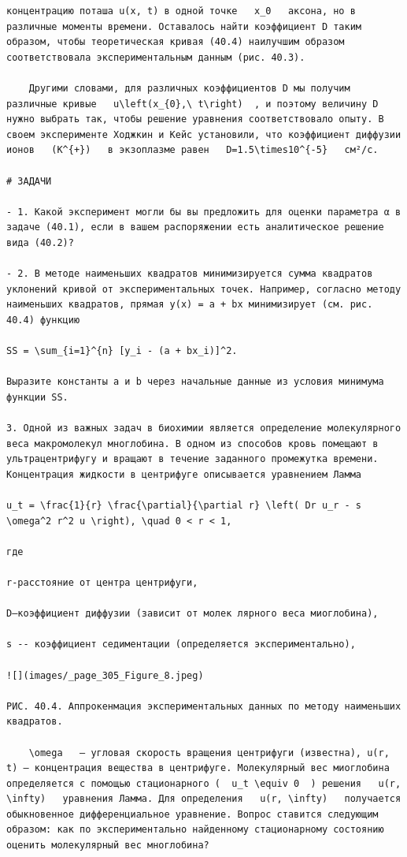 \documentclass[
  ukrainian,
]{article}
\begin{document}
\begin{verbatim}
концентрацию поташа u(x, t) в одной точке   x_0   аксона, но в различные моменты времени. Оставалось найти коэффициент D таким образом, чтобы теоретическая кривая (40.4) наилучшим образом соответствовала экспериментальным данным (рис. 40.3).

    Другими словами, для различных коэффициентов D мы получим различные кривые   u\left(x_{0},\ t\right)  , и поэтому величину D нужно выбрать так, чтобы решение уравнения соответствовало опыту. В своем эксперименте Ходжкин и Кейс установили, что коэффициент диффузии ионов   (K^{+})   в экзоплазме равен   D=1.5\times10^{-5}   см²/с.

# ЗАДАЧИ

- 1. Какой эксперимент могли бы вы предложить для оценки параметра α в задаче (40.1), если в вашем распоряжении есть аналитическое решение вида (40.2)?

- 2. В методе наименьших квадратов минимизируется сумма квадратов уклонений кривой от экспериментальных точек. Например, согласно методу наименьших квадратов, прямая y(x) = a + bx минимизирует (см. рис. 40.4) функцию

SS = \sum_{i=1}^{n} [y_i - (a + bx_i)]^2.

Выразите константы a и b через начальные данные из условия минимума функции SS.

3. Одной из важных задач в биохимии является определение молекулярного веса макромолекул многлобина. В одном из способов кровь помещают в ультрацентрифугу и вращают в течение заданного промежутка времени. Концентрация жидкости в центрифуге описывается уравнением Ламма

u_t = \frac{1}{r} \frac{\partial}{\partial r} \left( Dr u_r - s \omega^2 r^2 u \right), \quad 0 < r < 1,

где

r-расстояние от центра центрифуги,

D—коэффициент диффузии (зависит от молек лярного веса миоглобина),

s -- коэффициент седиментации (определяется экспериментально),

![](images/_page_305_Figure_8.jpeg)

РИС. 40.4. Аппрокенмация экспериментальных данных по методу наименьших квадратов.

    \omega   — угловая скорость вращения центрифуги (известна), u(r, t) — концентрация вещества в центрифуге. Молекулярный вес миоглобина определяется с помощью стационарного (  u_t \equiv 0  ) решения   u(r, \infty)   уравнения Ламма. Для определения   u(r, \infty)   получается обыкновенное дифференциальное уравнение. Вопрос ставится следующим образом: как по экспериментально найденному стационарному состоянию оценить молекулярный вес многлобина?


\end{verbatim}
\end{document}
